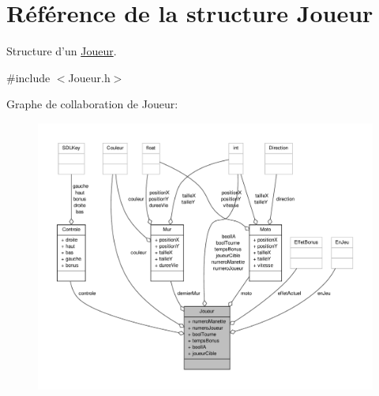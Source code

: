 \hypertarget{structJoueur}{\section{Référence de la structure Joueur}
\label{structJoueur}
}


Structure d'un \hyperlink{structJoueur}{Joueur}.  




{\ttfamily \#include $<$Joueur.\-h$>$}



Graphe de collaboration de Joueur\-:
\nopagebreak
\begin{figure}[H]
\begin{center}
\leavevmode
\includegraphics[width=350pt]{structJoueur__coll__graph}
\end{center}
\end{figure}

